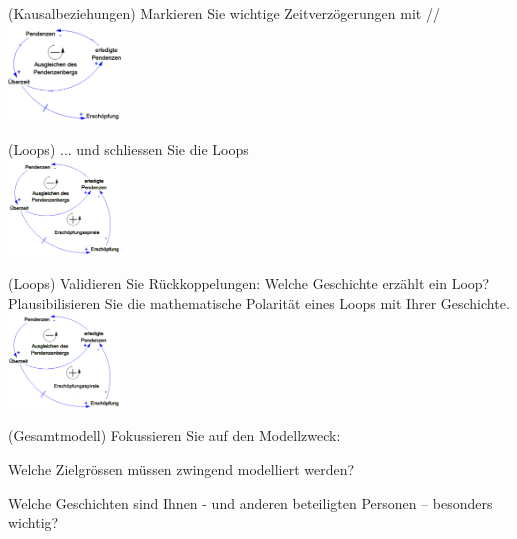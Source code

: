 \begin{multicols}{2}
\begin{compactenum}
		\item (Kausalbeziehungen) Markieren Sie wichtige Zeitverzögerungen mit // \\
		\includegraphics[width=0.225\textwidth]{pictures/regel_9}
		\item (Loops) ... und schliessen Sie die Loops \\
		\includegraphics[width=0.225\textwidth]{pictures/regel_10}
		\item (Loops) Validieren Sie Rückkoppelungen: Welche Geschichte erzählt ein	Loop? Plausibilisieren Sie die mathematische Polarität eines Loops mit Ihrer Geschichte. \\
		\includegraphics[width=0.225\textwidth]{pictures/regel_11}
		\item (Gesamtmodell) Fokussieren Sie auf den Modellzweck:
		\begin{compactitem}
			\item Welche Zielgrössen müssen zwingend modelliert werden?
			\item Welche Geschichten sind Ihnen - und anderen beteiligten Personen – besonders wichtig?
		\end{compactitem}
	\end{compactenum}
\end{multicols}	

